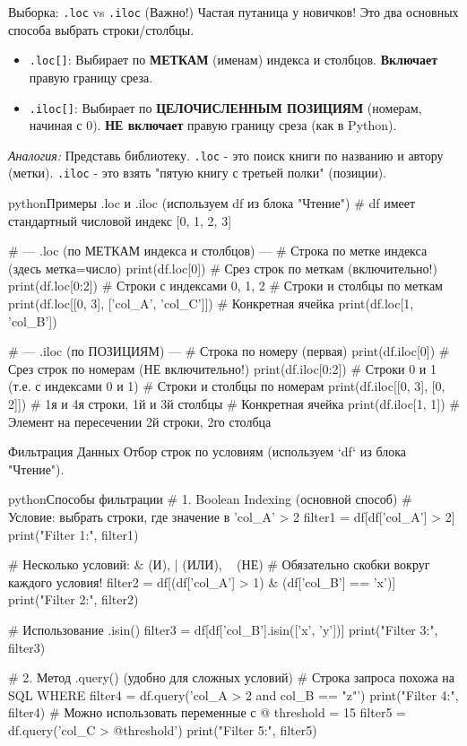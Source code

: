 \begin{alerttextbox}{{Выборка: \texttt{.loc} vs \texttt{.iloc} (Важно!)}}
    Частая путаница у новичков! Это два основных способа выбрать строки/столбцы.
    \begin{itemize}
        \item \texttt{.loc[]}: Выбирает по \textbf{МЕТКАМ} (именам) индекса и столбцов. \textbf{Включает} правую границу среза.
        \item \texttt{.iloc[]}: Выбирает по \textbf{ЦЕЛОЧИСЛЕННЫМ ПОЗИЦИЯМ} (номерам, начиная с 0). \textbf{НЕ включает} правую границу среза (как в Python).
    \end{itemize}
    \textit{Аналогия:} Представь библиотеку. \texttt{.loc} - это поиск книги по названию и автору (метки). \texttt{.iloc} - это взять "пятую книгу с третьей полки" (позиции).
    \begin{codebox}{python}{Примеры .loc и .iloc (используем df из блока "Чтение")}
    # df имеет стандартный числовой индекс [0, 1, 2, 3]

    # --- .loc (по МЕТКАМ индекса и столбцов) ---
    # Строка по метке индекса (здесь метка=число)
    print(df.loc[0])
    # Срез строк по меткам (включительно!)
    print(df.loc[0:2]) # Строки с индексами 0, 1, 2
    # Строки и столбцы по меткам
    print(df.loc[[0, 3], ['col_A', 'col_C']])
    # Конкретная ячейка
    print(df.loc[1, 'col_B'])

    # --- .iloc (по ПОЗИЦИЯМ) ---
    # Строка по номеру (первая)
    print(df.iloc[0])
    # Срез строк по номерам (НЕ включительно!)
    print(df.iloc[0:2]) # Строки 0 и 1 (т.е. с индексами 0 и 1)
    # Строки и столбцы по номерам
    print(df.iloc[[0, 3], [0, 2]]) # 1я и 4я строки, 1й и 3й столбцы
    # Конкретная ячейка
    print(df.iloc[1, 1]) # Элемент на пересечении 2й строки, 2го столбца
    \end{codebox}
\end{alerttextbox}

\begin{myblock}{{Фильтрация Данных}}
    Отбор строк по условиям (используем `df` из блока "Чтение").
    \begin{codebox}{python}{Способы фильтрации}
    # 1. Boolean Indexing (основной способ)
    # Условие: выбрать строки, где значение в 'col_A' > 2
    filter1 = df[df['col_A'] > 2]
    print("Filter 1:\n", filter1)

    # Несколько условий: & (И), | (ИЛИ), ~ (НЕ)
    # Обязательно скобки вокруг каждого условия!
    filter2 = df[(df['col_A'] > 1) & (df['col_B'] == 'x')]
    print("Filter 2:\n", filter2)

    # Использование .isin()
    filter3 = df[df['col_B'].isin(['x', 'y'])]
    print("Filter 3:\n", filter3)

    # 2. Метод .query() (удобно для сложных условий)
    # Строка запроса похожа на SQL WHERE
    filter4 = df.query('col_A > 2 and col_B == "z"')
    print("Filter 4:\n", filter4)
    # Можно использовать переменные с @
    threshold = 15
    filter5 = df.query('col_C > @threshold')
    print("Filter 5:\n", filter5)
    \end{codebox}
\end{myblock}

